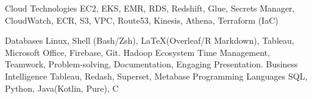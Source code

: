 

\begin{cvskills}

  \cvskill
    {Cloud Technologies} %
    {EC2, EKS, EMR, RDS, Redshift, Glue, Secrets Manager, CloudWatch, ECR, S3, VPC, Route53,}
    {Kinesis, Athena, Terraform (IaC)} %

  \cvskill
    {Databases} %
    {Linux, Shell (Bash/Zsh), \LaTeX (Overleaf/R Markdown), Tableau, Microsoft Office, Firebase, Git.} %
  \cvskill
    {Hadoop Ecosystem} %
    {Time Management, Teamwork, Problem-solving, Documentation, Engaging Presentation.} %
  \cvskill
  {Business Intelligence}
  {Tableau, Redash, Superset, Metabase} %
  \cvskill
  {Programming Languages}
  {SQL, Python, Java(Kotlin, Pure), C} %

\end{cvskills}
